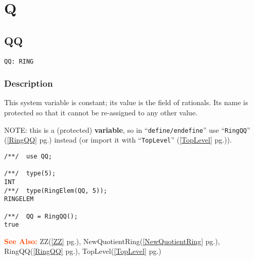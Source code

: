 \documentclass[a4paper]{mybook}
\newenvironment{command}{}{} %
\newcommand\SeeAlso{\par\textcolor{OrangeRed}{\textbf{\large See Also: }}}
\begin{document}
\chapter{Q}  %
\label{Q}

\section{QQ}
\label{QQ}
\begin{command} %


\begin{Verbatim}[label=syntax, rulecolor=\color{MidnightBlue},
frame=single]
QQ: RING
\end{Verbatim}


\subsection*{Description}

This system variable is constant; its value is the field of rationals.
Its name is protected so that it cannot be re-assigned to any other
value.
\par 
NOTE: this is a (protected) \textbf{variable}, so in ``\verb&define/endefine&'' 
use ``\verb&RingQQ&'' (\ref{RingQQ} pg.\pageref{RingQQ}) instead (or import it with ``\verb&TopLevel&'' (\ref{TopLevel} pg.\pageref{TopLevel})).
\begin{Verbatim}[label=example, rulecolor=\color{PineGreen}, frame=single]
/**/  use QQ;

/**/  type(5);
INT
/**/  type(RingElem(QQ, 5));
RINGELEM

/**/  QQ = RingQQ();
true
\end{Verbatim}


\SeeAlso %
  ZZ(\ref{ZZ} pg.\pageref{ZZ}), 
    NewQuotientRing(\ref{NewQuotientRing} pg.\pageref{NewQuotientRing}), 
    RingQQ(\ref{RingQQ} pg.\pageref{RingQQ}), 
    TopLevel(\ref{TopLevel} pg.\pageref{TopLevel})
\end{command} %
\end{document}
